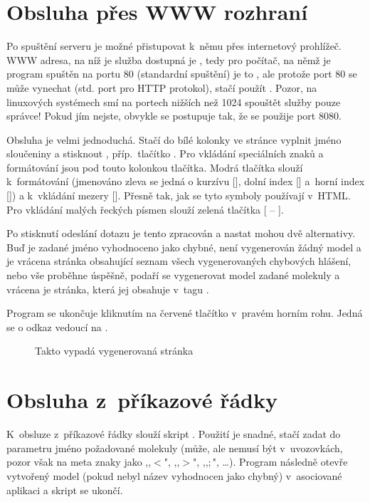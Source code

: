\section{Obsluha přes WWW rozhraní}
Po spuštění serveru je možné přistupovat k~němu přes internetový prohlížeč.
WWW adresa, na níž je služba dostupná je
, tedy pro počítač, na němž je
program spuštěn na portu 80 (standardní spuštění) je to
, ale protože port 80 se může vynechat
(std. port pro HTTP protokol), stačí použít
. Pozor, na linuxových systémech smí na
portech nižších než 1024 spouštět služby pouze správce! Pokud jím nejste,
obvykle se postupuje tak, že se použije port 8080.

Obsluha je velmi jednoduchá. Stačí do bílé kolonky ve stránce vyplnit jméno
sloučeniny a stisknout , příp.~tlačítko .
Pro vkládání speciálních znaků a formátování jsou pod touto kolonkou tlačítka.
Modrá tlačítka slouží k~formátování (jmenováno zleva se jedná o kurzívu [],
dolní index [] a~horní index []) a k~vkládání mezery [\kod{\_}].
Přesně tak, jak se tyto symboly používají v~HTML. Pro vkládání malých řeckých
písmen slouží zelená tlačítka [\kod{$\alpha$} -- \kod{$\omega$}].

Po stisknutí odeslání dotazu je tento zpracován a nastat mohou dvě alternativy.
Buď je zadané jméno vyhodnoceno jako chybné, není vygenerován žádný model a je
vrácena stránka obsahující seznam všech vygenerovaných chybových hlášení, nebo
vše proběhne úspěšně, podaří se vygenerovat model zadané molekuly a vrácena je
stránka, která jej obsahuje v~tagu .

Program se ukončuje kliknutím na červené tlačítko  v~pravém horním
rohu. Jedná se o odkaz vedoucí na .

\begin{figure}[h]
	\caption{Takto vypadá vygenerovaná stránka}
\end{figure}

\section{Obsluha z~příkazové řádky}
K~obsluze z~příkazové řádky slouží skript . Použití je snadné,
stačí zadat do parametru jméno požadované molekuly (může, ale nemusí být
v~uvozovkách, pozor však na meta znaky jako ,,$<$", ,,$>$", ,,$;$", \dots).
Program následně otevře vytvořený model (pokud nebyl název vyhodnocen jako
chybný) v~asociované aplikaci a skript se ukončí.

